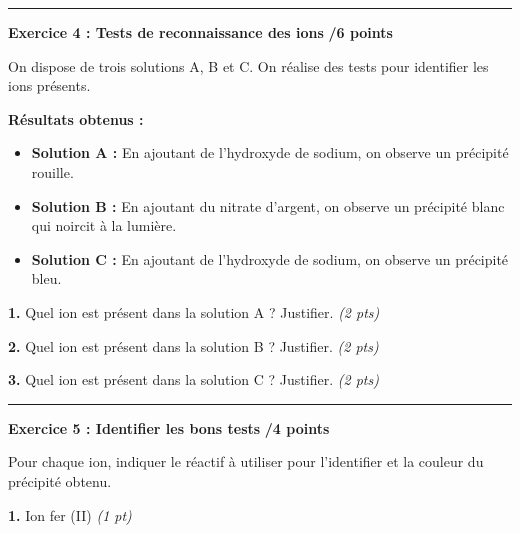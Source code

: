 \documentclass[11pt,a4paper]{article}
\newcommand{\cadreblanc}[1]{%
	\medskip\framebox[\linewidth][c]{%
		\rule{0mm}{#1mm}}\par
	\medskip}
\begin{document}
	\vspace{5mm}
	
	\hrule
	\vspace{3mm}
	
	
	\textbf{Exercice 4 : Tests de reconnaissance des ions} \hfill \textbf{/6 points}
	
	\vspace{3mm}
	
	On dispose de trois solutions A, B et C. On réalise des tests pour identifier les ions présents.
	
	\vspace{3mm}
	
	\textbf{Résultats obtenus :}
	
	\begin{itemize}
		\item \textbf{Solution A :} En ajoutant de l'hydroxyde de sodium, on observe un précipité rouille.
		\item \textbf{Solution B :} En ajoutant du nitrate d'argent, on observe un précipité blanc qui noircit à la lumière.
		\item \textbf{Solution C :} En ajoutant de l'hydroxyde de sodium, on observe un précipité bleu.
	\end{itemize}
	
	\vspace{3mm}
	
	\textbf{1.} Quel ion est présent dans la solution A ? Justifier. \hfill \textit{(2 pts)}
	
	\cadreblanc{20}
	
	\textbf{2.} Quel ion est présent dans la solution B ? Justifier. \hfill \textit{(2 pts)}
	
	\cadreblanc{20}
	
	\textbf{3.} Quel ion est présent dans la solution C ? Justifier. \hfill \textit{(2 pts)}
	
	\cadreblanc{20}
	
	
	
	\hrule
	\vspace{3mm}
	
	\textbf{Exercice 5 : Identifier les bons tests} \hfill \textbf{/4 points}
	
	\vspace{3mm}
	
	Pour chaque ion, indiquer le réactif à utiliser pour l'identifier et la couleur du précipité obtenu.
	
	\vspace{3mm}
	
	\textbf{1.} Ion fer (II)  \hfill \textit{(1 pt)}
	
\end{document}

